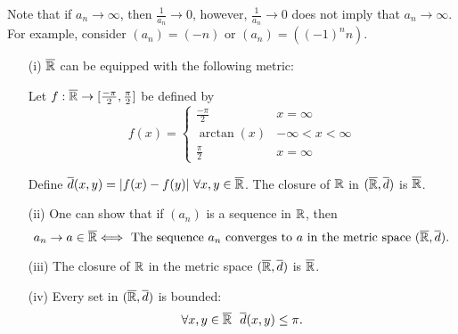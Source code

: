 \documentclass[a4paper]{article}
\begin{document}
Note that if \( {a}_{n} \to \infty   \), then \( \frac{ 1 }{ {a}_{n}  }  \to 0  \), however, \( \frac{ 1 }{ {a}_{n} }  \to 0  \) does not imply that \( {a}_{n} \to \infty  \). For example, consider \( ({a}_{n}) = (-n) \) or \( ({a}_{n}) = ((-1)^{n} n) \).

\begin{remark}
    \begin{enumerate}
        \item[(i)] \( \overline{\mathbb{R}} \) can be equipped with the following metric:
    \begin{center}
        Let \( f: \overline{\mathbb{R}} \to [\frac{ -\pi }{ 2 } , \frac{ \pi }{ 2 } ] \) be defined by 
        \[  f(x) = 
        \begin{cases}
            \frac{ -\pi }{ 2 }  &x = \infty  \\
            \arctan(x) &-\infty < x < \infty  \\ 
            \frac{ \pi }{ 2 }  &x = \infty 
        \end{cases}  \]
    \end{center}
    Define \( \overline{d}(x,y) = | f(x) - f(y) | \ \forall x,y \in \overline{\mathbb{R}}  \). The closure of \( \mathbb{R}  \) in \( (\overline{\mathbb{R}}, \overline{d}) \) is \( \overline{\mathbb{R}} \).
        \item[(ii)] One can show that if \( ({a}_{n}) \) is a sequence in \( \mathbb{R}  \), then
            \[  {a}_{n} \to a \in \overline{\mathbb{R}} \Longleftrightarrow \ \text{The sequence \( {a}_{n} \) converges to \( a  \) in the metric space \( (\overline{\ensuremath{\mathbb{R}}}, \overline{d}) \).} \]
        \item[(iii)] The closure of \( \mathbb{R}  \) in the metric space \( (\overline{\mathbb{R}}, \overline{d}) \) is \( \overline{\mathbb{R}} \).
        \item[(iv)] Every set in \( (\overline{\mathbb{R}}, \overline{d}) \) is bounded:
            \[ \forall x,y \in \overline{\R} \ \ \overline{d}(x,y) \leq \pi. \]
    \end{enumerate}
\end{remark}
\end{document}
